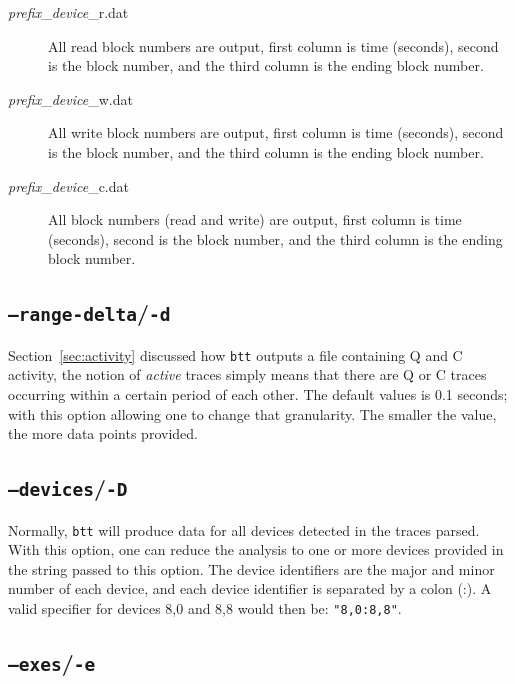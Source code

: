\documentclass{article}
\begin{document}
  \begin{description}
    \item[\emph{prefix}\_\emph{device}\_r.dat] All read block numbers are
    output, first column is time (seconds), second is the block number,
    and the third column is the ending block number.

    \item[\emph{prefix}\_\emph{device}\_w.dat] All write block numbers are
    output, first column is time (seconds), second is the block number,
    and the third column is the ending block number.

    \item[\emph{prefix}\_\emph{device}\_c.dat] All block numbers (read
    and write) are output, first column is time (seconds), second is
    the block number, and the third column is the ending block number.
  \end{description}

\subsection{\label{sec:o-d}\texttt{--range-delta}/\texttt{-d}}

  Section~\ref{sec:activity} discussed how \texttt{btt} outputs a file
  containing Q and C activity, the notion of \emph{active} traces simply
  means that there are Q or C traces occurring within a certain period
  of each other. The default values is 0.1 seconds; with this option
  allowing one to change that granularity. The smaller the value, the
  more data points provided.

\subsection{\label{sec:o-D}\texttt{--devices}/\texttt{-D}}

  Normally, \texttt{btt} will produce data for all devices detected in
  the traces parsed. With this option, one can reduce the analysis to
  one or more devices provided in the string passed to this option. The
  device identifiers are the major and minor number of each device, and
  each device identifier is separated by a colon (:). A valid specifier
  for devices 8,0 and 8,8 would then be: \texttt{"8,0:8,8"}.

\subsection{\label{sec:o-e}\texttt{--exes}/\texttt{-e}}
\end{document}
